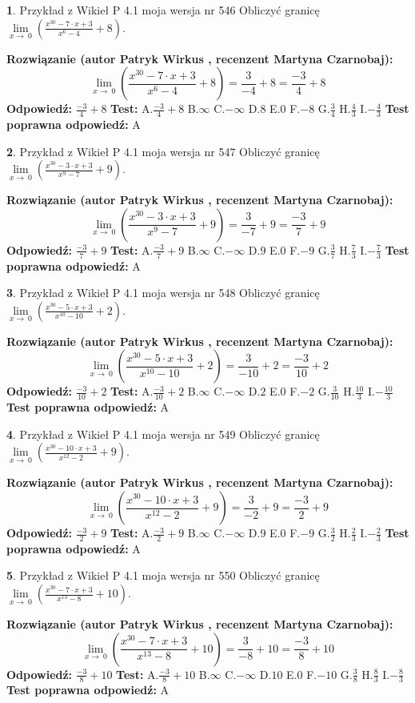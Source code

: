 \documentclass[12pt, a4paper]{article}
\theoremstyle{definition} %
\newtheorem{zad}{}
\newcommand{\zadStart}[1]{\begin{zad}#1\newline}
\newcommand{\zadStop}{\end{zad}}
\newcommand{\rozwStart}[2]{\noindent \textbf{Rozwiązanie (autor #1 , recenzent #2): }\newline}
\newcommand{\rozwStop}{\newline}
\newcommand{\odpStart}{\noindent \textbf{Odpowiedź:}\newline}
\newcommand{\odpStop}{\newline}
\newcommand{\testStart}{\noindent \textbf{Test:}\newline}
\newcommand{\testStop}{\newline}
\newcommand{\kluczStart}{\noindent \textbf{Test poprawna odpowiedź:}\newline}
\newcommand{\kluczStop}{\newline}
\begin{document}
\zadStart{Przykład z Wikieł P 4.1 moja wersja nr 546}
Obliczyć granicę $\lim\limits_{x\to\ 0}(\frac{x^{30}-7 \cdot x +3}{x^{6}-4}+8)$.
\zadStop
\rozwStart{Patryk Wirkus}{Martyna Czarnobaj}
$$\lim\limits_{x\to\ 0}(\frac{x^{30}-7 \cdot x +3}{x^{6}-4}+8)=\frac{3}{-4}+8=\frac{-3}{4}+8$$
\rozwStop
\odpStart
$\frac{-3}{4}+8$
\odpStop
\testStart
A.$\frac{-3}{4}+8$
B.$\infty$
C.$-\infty$
D.$8$
E.$0$
F.$-8$
G.$\frac{3}{4}$
H.$\frac{4}{3}$
I.$-\frac{4}{3}$
\testStop
\kluczStart
A
\kluczStop



\zadStart{Przykład z Wikieł P 4.1 moja wersja nr 547}
Obliczyć granicę $\lim\limits_{x\to\ 0}(\frac{x^{30}-3 \cdot x +3}{x^{9}-7}+9)$.
\zadStop
\rozwStart{Patryk Wirkus}{Martyna Czarnobaj}
$$\lim\limits_{x\to\ 0}(\frac{x^{30}-3 \cdot x +3}{x^{9}-7}+9)=\frac{3}{-7}+9=\frac{-3}{7}+9$$
\rozwStop
\odpStart
$\frac{-3}{7}+9$
\odpStop
\testStart
A.$\frac{-3}{7}+9$
B.$\infty$
C.$-\infty$
D.$9$
E.$0$
F.$-9$
G.$\frac{3}{7}$
H.$\frac{7}{3}$
I.$-\frac{7}{3}$
\testStop
\kluczStart
A
\kluczStop



\zadStart{Przykład z Wikieł P 4.1 moja wersja nr 548}
Obliczyć granicę $\lim\limits_{x\to\ 0}(\frac{x^{30}-5 \cdot x +3}{x^{10}-10}+2)$.
\zadStop
\rozwStart{Patryk Wirkus}{Martyna Czarnobaj}
$$\lim\limits_{x\to\ 0}(\frac{x^{30}-5 \cdot x +3}{x^{10}-10}+2)=\frac{3}{-10}+2=\frac{-3}{10}+2$$
\rozwStop
\odpStart
$\frac{-3}{10}+2$
\odpStop
\testStart
A.$\frac{-3}{10}+2$
B.$\infty$
C.$-\infty$
D.$2$
E.$0$
F.$-2$
G.$\frac{3}{10}$
H.$\frac{10}{3}$
I.$-\frac{10}{3}$
\testStop
\kluczStart
A
\kluczStop



\zadStart{Przykład z Wikieł P 4.1 moja wersja nr 549}
Obliczyć granicę $\lim\limits_{x\to\ 0}(\frac{x^{30}-10 \cdot x +3}{x^{12}-2}+9)$.
\zadStop
\rozwStart{Patryk Wirkus}{Martyna Czarnobaj}
$$\lim\limits_{x\to\ 0}(\frac{x^{30}-10 \cdot x +3}{x^{12}-2}+9)=\frac{3}{-2}+9=\frac{-3}{2}+9$$
\rozwStop
\odpStart
$\frac{-3}{2}+9$
\odpStop
\testStart
A.$\frac{-3}{2}+9$
B.$\infty$
C.$-\infty$
D.$9$
E.$0$
F.$-9$
G.$\frac{3}{2}$
H.$\frac{2}{3}$
I.$-\frac{2}{3}$
\testStop
\kluczStart
A
\kluczStop



\zadStart{Przykład z Wikieł P 4.1 moja wersja nr 550}
Obliczyć granicę $\lim\limits_{x\to\ 0}(\frac{x^{30}-7 \cdot x +3}{x^{13}-8}+10)$.
\zadStop
\rozwStart{Patryk Wirkus}{Martyna Czarnobaj}
$$\lim\limits_{x\to\ 0}(\frac{x^{30}-7 \cdot x +3}{x^{13}-8}+10)=\frac{3}{-8}+10=\frac{-3}{8}+10$$
\rozwStop
\odpStart
$\frac{-3}{8}+10$
\odpStop
\testStart
A.$\frac{-3}{8}+10$
B.$\infty$
C.$-\infty$
D.$10$
E.$0$
F.$-10$
G.$\frac{3}{8}$
H.$\frac{8}{3}$
I.$-\frac{8}{3}$
\testStop
\kluczStart
A
\kluczStop
\end{document}
